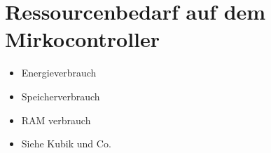\section{Ressourcenbedarf auf dem Mirkocontroller}
\begin{itemize}
    \item Energieverbrauch
    \item Speicherverbrauch
    \item RAM verbrauch
    \item Siehe Kubik und Co.
\end{itemize}